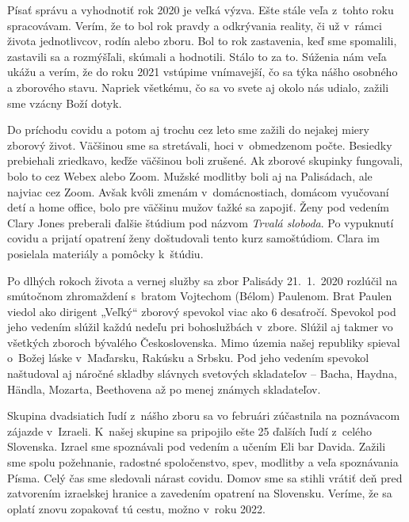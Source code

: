 

Písať správu a vyhodnotiť rok 2020 je veľká výzva. Ešte stále veľa z~tohto roku spracovávam. Verím, že to bol rok pravdy a odkrývania reality, či už v~rámci života jednotlivcov, rodín alebo zboru. Bol to rok zastavenia, keď sme spomalili, zastavili sa a rozmýšľali, skúmali a hodnotili. Stálo to za to. Súženia nám veľa ukážu a verím, že do roku 2021 vstúpime vnímavejší, čo sa týka nášho osobného a zborového stavu. Napriek všetkému, čo sa vo svete aj okolo nás udialo, zažili sme vzácny Boží dotyk.

Do príchodu covidu a potom aj trochu cez leto sme zažili do nejakej miery zborový život. Väčšinou sme sa stretávali, hoci v~obmedzenom počte. Besiedky prebiehali zriedkavo, keďže väčšinou boli zrušené. Ak zborové skupinky fungovali, bolo to cez Webex alebo Zoom. Mužské modlitby boli aj na Palisádach, ale najviac cez Zoom. Avšak kvôli zmenám v~domácnostiach, domácom vyučovaní detí a home office, bolo pre väčšinu mužov ťažké sa zapojiť.  Ženy pod vedením Clary Jones preberali ďalšie štúdium pod názvom {\it Trvalá sloboda}. Po vypuknutí covidu a prijatí opatrení ženy doštudovali tento kurz samoštúdiom.  Clara im posielala materiály a pomôcky k~štúdiu.

Po dlhých rokoch života a vernej služby sa zbor Palisády 21.~1.~2020 rozlúčil na smútočnom zhromaždení s~bratom Vojtechom (Bélom) Paulenom. Brat Paulen viedol ako dirigent „Veľký“ zborový spevokol viac ako 6 desaťročí. Spevokol pod jeho vedením slúžil každú nedeľu pri bohoslužbách v~zbore.  Slúžil aj takmer vo všetkých zboroch bývalého Československa. Mimo územia našej republiky spieval o~Božej láske v~Maďarsku, Rakúsku a Srbsku. Pod jeho vedením spevokol naštudoval aj náročné skladby slávnych svetových skladateľov -- Bacha, Haydna, Händla, Mozarta, Beethovena až po menej známych skladateľov.

Skupina dvadsiatich ľudí z~nášho zboru sa vo februári zúčastnila na poznávacom zájazde v~Izraeli. K~našej skupine sa pripojilo ešte 25 ďalších ľudí z~celého Slovenska. Izrael sme spoznávali pod vedením a učením Eli bar Davida. Zažili sme spolu požehnanie, radostné spoločenstvo, spev, modlitby a veľa spoznávania Písma. Celý čas sme sledovali nárast covidu. Domov sme sa stihli vrátiť deň pred zatvorením izraelskej hranice a zavedením opatrení na Slovensku.  Veríme, že sa oplatí znovu zopakovať tú cestu, možno v~roku 2022.

